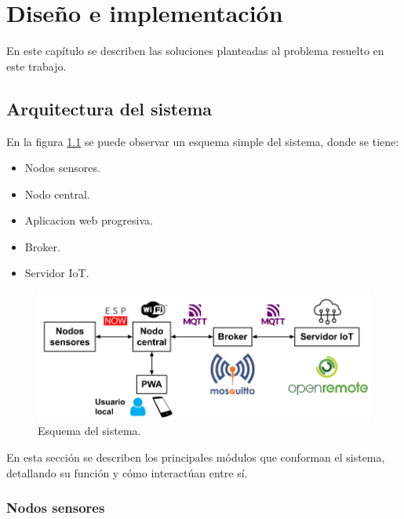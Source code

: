 \chapter{Diseño e implementación} %

En este capítulo se describen las soluciones planteadas al problema resuelto en este trabajo.

\section{Arquitectura del sistema}

En la figura \ref{fig:arqSistema} se puede observar un esquema simple del sistema, donde se tiene:

\begin{itemize}
	\item Nodos sensores.
	\item Nodo central.
	\item Aplicacion web progresiva.
	\item Broker.
	\item Servidor IoT.
\end{itemize}

\begin{figure}[H]
\centering 
\includegraphics[width=1\textwidth]{./Figures/arq_sistema.png}
\caption{Esquema del sistema.}
\label{fig:arqSistema}
\end{figure}

En esta sección se describen los principales módulos que conforman el sistema, detallando su función y cómo interactúan entre sí.

\subsection{Nodos sensores} 

